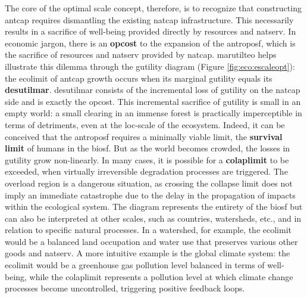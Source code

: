\documentclass[./main_en.tex]{subfiles}
\begin{document}
\par The core of the optimal scale concept, therefore, is to recognize that constructing \gls{antcap} requires dismantling the existing \gls{natcap} infrastructure. This necessarily results in a sacrifice of well-being provided directly by resources and \gls{natserv}. In economic jargon, there is an \textbf{\gls{opcost}} to the expansion of the \gls{antroposf}, which is the sacrifice of resources and \gls{natserv} provided by \gls{natcap}. \gls{marutilteo} helps illustrate this dilemma through the \gls{gutility} diagram (Figure \ref{fig:eco:escaleopt}): the \gls{ecolimit} of \gls{antcap} growth occurs when its marginal \gls{gutility} equals its \textbf{\gls{desutilmar}}. \gls{desutilmar} consists of the incremental loss of \gls{gutility} on the \gls{natcap} side and is exactly the \gls{opcost}. This incremental sacrifice of \gls{gutility} is small in an empty world: a small clearing in an immense forest is practically imperceptible in terms of detriments, even at the \gls{loc-scale} of the ecosystem. Indeed, it can be conceived that the \gls{antroposf} requires a minimally viable limit, the \textbf{survival limit} of humans in the \gls{biosf}. But as the world becomes crowded, the losses in \gls{gutility} grow non-linearly. In many cases, it is possible for a \textbf{\gls{colaplimit}} to be exceeded, when virtually irreversible degradation processes are triggered. The overload region is a dangerous situation, as crossing the collapse limit does not imply an immediate catastrophe due to the delay in the propagation of impacts within the ecological system. The diagram represents the entirety of the \gls{biosf} but can also be interpreted at other scales, such as countries, watersheds, etc., and in relation to specific natural processes. In a watershed, for example, the \gls{ecolimit} would be a balanced land occupation and water use that preserves various other goods and \gls{natserv}. A more intuitive example is the global climate \gls{system}: the \gls{ecolimit} would be a greenhouse gas pollution level balanced in terms of well-being, while the \gls{colaplimit} represents a pollution level at which climate change processes become uncontrolled, triggering positive feedback loops.
\end{document}
